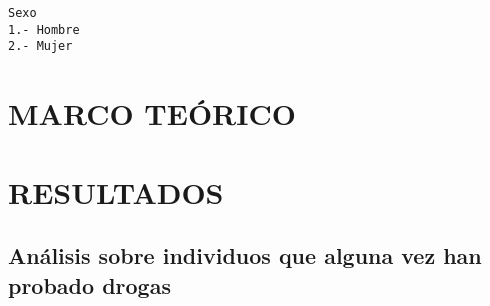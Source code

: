 \documentclass[]{article}
\begin{document}
\begin{verbatim}
Sexo
1.- Hombre
2.- Mujer
\end{verbatim}

\section{MARCO TEÓRICO}\label{marco-teorico}

\section{RESULTADOS}\label{resultados}

\subsection{Análisis sobre individuos que alguna vez han probado
drogas}\label{analisis-sobre-individuos-que-alguna-vez-han-probado-drogas}
\end{document}
